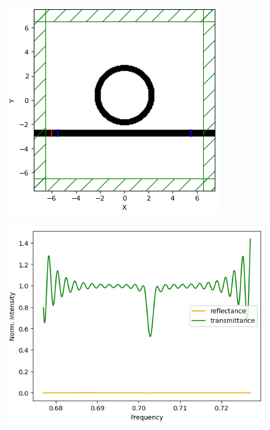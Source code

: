 \begin{figure}[H]
    \centering
    \includegraphics[width=0.8\linewidth]{Figures/ring_design.png}
    \caption{}
    \label{fig:ring_design}
\end{figure}

\begin{figure}[H]
    \centering
    \includegraphics[width=0.8\linewidth]{Figures/ring_spectrum.png}
    \caption{}
    \label{fig:ring_spectrum}
\end{figure}

